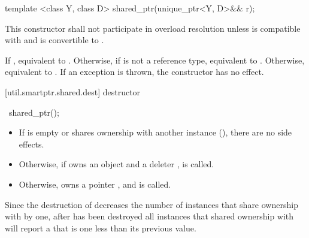 %
%
\begin{itemdecl}
template <class Y, class D> shared_ptr(unique_ptr<Y, D>&& r);
\end{itemdecl}

\begin{itemdescr}
\pnum\remarks This constructor shall not participate in overload resolution
unless  is compatible with  and
 is convertible to .

\pnum
\effects If , equivalent to .
Otherwise, if  is not a reference type,
equivalent to .
Otherwise, equivalent to .
If an exception is thrown, the constructor has no effect.
\end{itemdescr}

[util.smartptr.shared.dest]{ destructor}

%
\begin{itemdecl}
~shared_ptr();
\end{itemdecl}

\begin{itemdescr}
\pnum\effects
\begin{itemize}
\item If  is empty or shares ownership with another
 instance (), there are no side effects.

\item
Otherwise, if  owns an object
 and a deleter ,  is called.

\item Otherwise,  owns a pointer ,
and  is called.
\end{itemize}
\end{itemdescr}

\pnum
\begin{note} Since the destruction of 
decreases the number of instances that share ownership with 
by one,
after  has been destroyed
all  instances that shared ownership with
 will report a  that is one less
than its previous value. \end{note}

